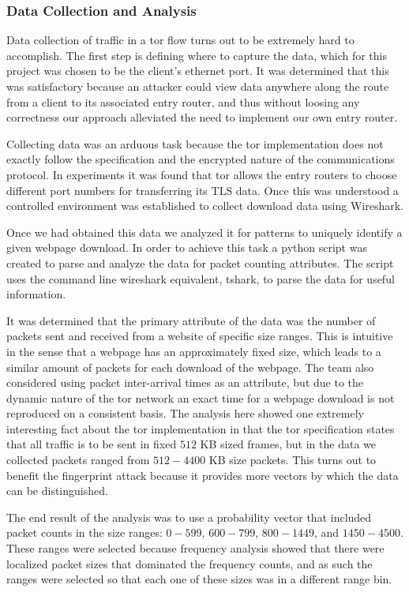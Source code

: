 \documentclass{usenixsubmit}
\begin{document}
\subsubsection{Data Collection and Analysis}
Data collection of traffic in a tor flow turns out to be extremely hard to 
accomplish. The first step is defining where to capture the data, which for
this project was chosen to be the client's ethernet port. It was determined
that this was satisfactory because an attacker could view data anywhere along
the route from a client to its associated entry router, and thus without 
loosing any correctness our approach alleviated the need to implement our own 
entry router. 

Collecting data was an arduous task because the tor implementation
does not exactly follow the specification and the encrypted nature of the 
communications protocol. In experiments it was found that tor allows the 
entry routers to choose different port numbers for transferring its TLS data. 
Once this was understood a controlled environment was established to collect
download data using Wireshark. 

Once we had obtained this data we analyzed it for patterns to uniquely identify
a given webpage download. In order to achieve this task a python script was
created to parse and analyze the data for packet counting attributes. The script
uses the command line wireshark equivalent, tshark, to parse the data for useful
information. 

It was determined that the primary attribute of the data was the number of 
packets sent and received from a website of specific size ranges. This is 
intuitive in the sense that a webpage has an approximately fixed size, which 
leads to a similar amount of packets for each download of the webpage. The team
also considered using packet inter-arrival times as an attribute, but due to the
dynamic nature of the tor network an exact time for a webpage download is not 
reproduced on a consistent basis. The analysis here showed one extremely
interesting fact about the tor implementation in that the tor specification
states that all traffic is to be sent in fixed $512$ KB sized frames, but 
in the data we collected packets ranged from $512-4400$ KB size packets. This
turns out to benefit the fingerprint attack because it provides more 
vectors by which the data can be distinguished. 

The end result of the analysis was to use a probability vector that included
packet counts in the size ranges: $0-599$, $600-799$, $800-1449$, and 
$1450-4500$. These ranges were selected because frequency analysis
showed that there were localized packet sizes that dominated the frequency counts, 
and as such the ranges were selected so that each one of these sizes was in a
different range bin. 
\end{document}
